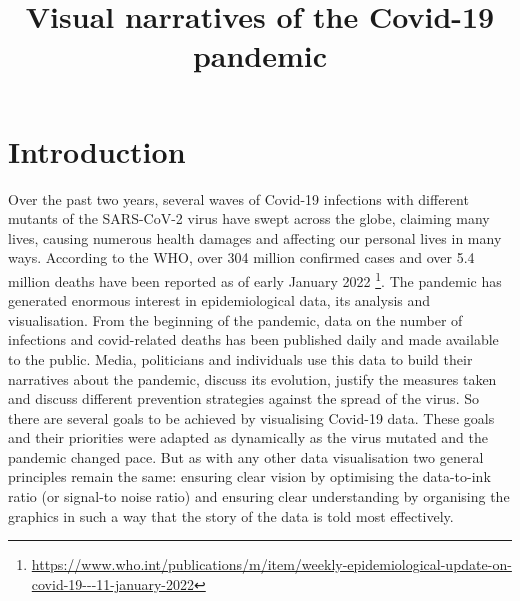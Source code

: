 \documentclass[article]{jdssv}\usepackage[]{graphicx}\usepackage[]{color}
\author{
   \And }
\title{Visual narratives of the Covid-19 pandemic}
\begin{document}







\section{Introduction}

Over the past two years, several waves of Covid-19 infections with different mutants of the SARS-CoV-2 virus have swept across the globe, claiming many lives, causing numerous health damages and affecting our personal lives in many ways. According to the WHO, over 304 million confirmed cases and over 5.4 million deaths have been reported as of early January 2022 \footnote{\url{https://www.who.int/publications/m/item/weekly-epidemiological-update-on-covid-19---11-january-2022}}. The pandemic has generated enormous interest in epidemiological data, its analysis and visualisation. From the beginning of the pandemic, data on the number of infections and covid-related deaths has been published daily and made available to the public. Media, politicians and individuals use this data to build their narratives about the pandemic, discuss its evolution, justify the measures taken and discuss different prevention strategies against the spread of the virus. So there are several goals to be achieved by visualising Covid-19 data. These goals and their priorities were adapted as dynamically as the virus mutated and the pandemic changed pace. But as with any other data visualisation two general principles remain the same: ensuring clear vision by optimising the data-to-ink ratio \citep{Tufte2001} (or signal-to noise ratio) and ensuring clear understanding by organising the graphics in such a way that the story of the data is told most effectively.
\end{document}
